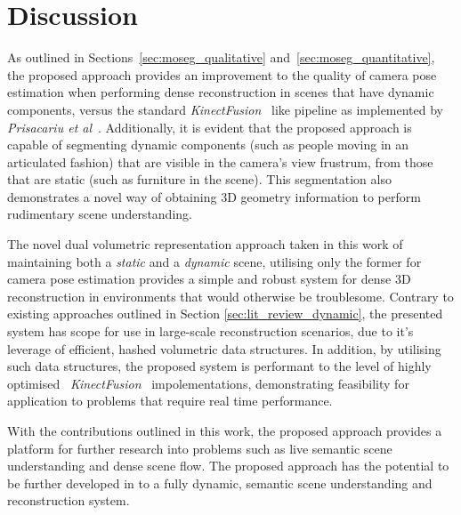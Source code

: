 \section{Discussion}
\label{sec:moseg_discussion}
As outlined in Sections~\ref{sec:moseg_qualitative} and~\ref{sec:moseg_quantitative}, the 
proposed approach provides an improvement to the quality of camera pose estimation when 
performing dense reconstruction in scenes that have dynamic components, versus the 
standard \textit{KinectFusion}~\cite{Newcombe2011} like pipeline as implemented by 
\textit{Prisacariu et al}~\cite{Prisacariu2014}. Additionally, it is evident that the 
proposed approach is capable of segmenting dynamic components (such as people moving in 
an articulated fashion) that are visible in the camera's view frustrum, from those that 
are static (such as furniture in the scene). This segmentation also demonstrates a novel 
way of obtaining 3D geometry information to perform rudimentary scene understanding.

The novel dual volumetric representation approach taken in this work of maintaining both a 
\textit{static} and a \textit{dynamic} scene, utilising only the former for camera pose 
estimation provides a simple and robust system for dense 3D reconstruction in environments 
that would otherwise be troublesome. Contrary to existing approaches outlined in Section 
\ref{sec:lit_review_dynamic}, the presented system has scope for use in large-scale 
reconstruction scenarios, due to it's leverage of efficient, hashed volumetric data structures. 
In addition, by utilising such data structures, the proposed system is performant to the 
level of highly optimised~\cite{Prisacariu2014} \textit{KinectFusion}~\cite{Newcombe2011} 
impolementations, demonstrating feasibility for application to problems that require 
real time performance.

With the contributions outlined in this work, the proposed approach provides a platform 
for further research into problems such as live semantic scene understanding and dense scene 
flow. The proposed approach has the potential to be further developed in to a fully dynamic, 
semantic scene understanding and reconstruction system.